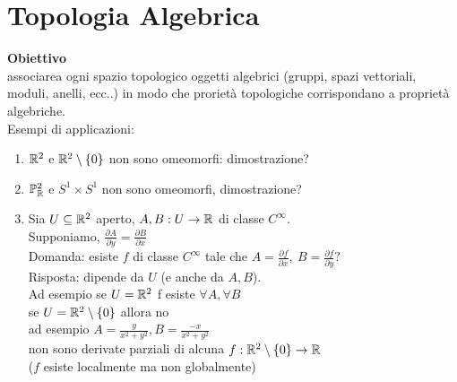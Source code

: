 \documentclass[12px]{article}
\begin{document}
	\section{Topologia Algebrica}
	\textbf{Obiettivo}\\
	associarea  ogni spazio topologico oggetti algebrici (gruppi, spazi vettoriali, moduli, anelli, ecc..) in modo che prorietà topologiche corrispondano a proprietà algebriche.\\
	Esempi di applicazioni:
	\begin{enumerate}
		\item $\mathbb{R}^2$ e $\mathbb{R}^2\setminus\{0\}$ non sono omeomorfi: dimostrazione?
		\item $\mathbb{P}^2_{\mathbb{R}}$ e  $S^1\times S^1$ non sono omeomorfi, dimostrazione? 
		\item Sia $U\subseteq \mathbb{R}^2$ aperto,  $A,B: U \rightarrow \mathbb{R}$ di classe $C^\infty$.\\
			Supponiamo,  $\frac{\partial A}{\partial y}=\frac{\partial B}{\partial x}$\\
			Domanda: esiste  $f$ di classe $C^\infty$ tale che  $A = \frac{\partial f}{\partial x}, \ B = \frac{\partial f}{\partial y}?$\\
			Risposta: dipende da  $U$ (e anche da $A, B$).\\
			Ad esempio se $U = \mathbb{R}^2$ f esiste $\forall A, \forall B$\\ se $U = \mathbb{R}^2\setminus\{0\}$ allora no\\
			ad esempio $A = \frac{y}{x^2+y^2}, B = \frac{-x}{x^2 + y^2}$\\
			non sono derivate parziali di alcuna  $f:\mathbb{R}^2\setminus\{0\} \rightarrow \mathbb{R}$\\
			($f$ esiste localmente ma non globalmente)
	\end{enumerate}
	\newpage
\end{document}
